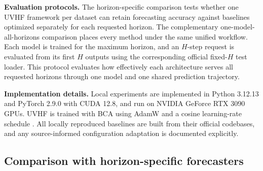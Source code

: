 \documentclass[final,3p,times]{elsarticle}
\newif\ifshowrevisions
\newcommand{\rev}[1]{\ifshowrevisions\textcolor{revisionblue}{#1}\else#1\fi}
\begin{document}
\textbf{Evaluation protocols.} The horizon-specific comparison tests whether one \rev{UVHF framework} per dataset can retain forecasting accuracy against baselines optimized separately for each requested horizon. The complementary one-model-all-horizons comparison places every method under the same unified workflow. Each model is trained for the maximum horizon, and an $H$-step request is evaluated from its first $H$ outputs using the corresponding official fixed-$H$ test loader. This protocol evaluates how effectively each architecture serves all requested horizons through one model and one shared prediction trajectory.

\textbf{Implementation details.} Local experiments are implemented in Python 3.12.13 and PyTorch 2.9.0 with CUDA 12.8, and run on NVIDIA GeForce RTX 3090 GPUs. \rev{UVHF is trained with BCA} using AdamW and a cosine learning-rate schedule \citep{loshchilov2019adamw,loshchilov2017sgdr}. All locally reproduced baselines are built from their official codebases, and any source-informed configuration adaptation is documented explicitly.

\subsection{Comparison with horizon-specific forecasters}
\label{sec:horizon-specific-comparison}
\end{document}
